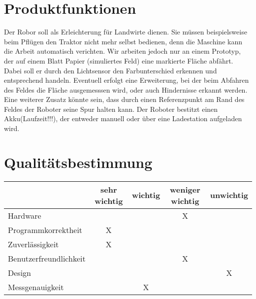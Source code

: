 \documentclass[12pt,a4paper]{article}
\begin{document}
\section{ Produktfunktionen}

Der Robor soll als Erleichterung für Landwirte dienen. Sie müssen beispielsweise beim Pflügen den Traktor nicht mehr selbst bedienen, denn die Maschine kann die Arbeit automatisch verichten.
Wir arbeiten jedoch nur an einem Prototyp, der auf einem Blatt Papier (simuliertes Feld) eine markierte Fläche abfährt. 
Dabei soll er durch den Lichtsensor den Farbunterschied erkennen und entsprechend handeln.
Eventuell erfolgt eine Erweiterung, bei der beim Abfahren des Feldes die Fläche ausgemesssen wird, oder auch Hindernisse erkannt werden.
Eine weiterer Zusatz könnte sein, dass durch einen Referenzpunkt am Rand des Feldes der Roboter seine Spur halten kann.
Der Roboter bestitzt einen Akku(Laufzeit!!!), der entweder manuell oder über eine Ladestation aufgeladen wird.

\section{ Qualitätsbestimmung}

\begin{tabular}{l||c|c|c|c}

 &sehr wichtig & wichtig& weniger wichtig& unwichtig\\
 \hline
 \hline
 Hardware&&& X & \\
 \hline
 Programmkorrektheit& X &  & &\\
 \hline
 Zuverlässigkeit& X &  &  & \\
 \hline
 Benutzerfreundlichkeit& & &X &\\
 \hline
 Design&&&&X\\
 \hline
 Messgenauigkeit&&X&&\\
 
\end{tabular}
\end{document}
